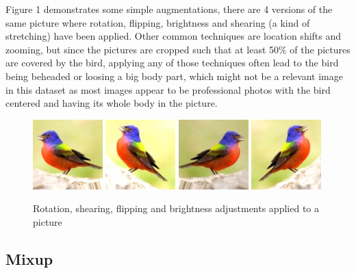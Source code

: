 \documentclass{article}
\begin{document}
Figure 1 demonstrates some simple augmentations, there are 4 versions of the same picture where rotation, flipping, brightness and shearing (a kind of stretching) have been applied. Other common techniques are location shifts and zooming, but since the pictures are cropped such that at least 50\% of the pictures are covered by the bird, applying any of those techniques often lead to the bird being beheaded or loosing a big body part, which might not be a relevant image in this dataset as most images appear to be professional photos with the bird centered and having its whole body in the picture.

\begin{figure}[h]
\includegraphics[width=0.24\textwidth]{aug1.jpeg}
\includegraphics[width=0.24\textwidth]{aug2.jpeg}
\includegraphics[width=0.24\textwidth]{aug3.jpeg}
\includegraphics[width=0.24\textwidth]{aug4.jpeg}
\caption{Rotation, shearing, flipping and brightness adjustments applied to a picture}
\end{figure}




\subsection{Mixup}
\end{document}

